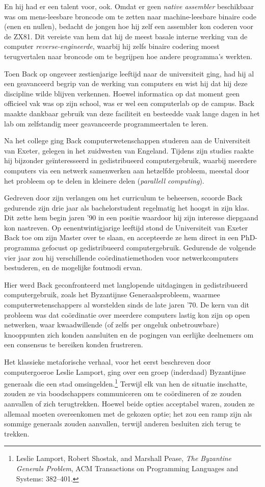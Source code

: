 \documentclass[
  a5paper,
  smalldemyvopaper,11pt,twoside,onecolumn,openright,extrafontsizes,
hidelinks]{memoir}
\begin{document}
En hij had er een talent voor, ook. Omdat er geen \emph{native
assembler} beschikbaar was om mens-leesbare broncode om te zetten naar
machine-leesbare binaire code (enen en nullen), bedacht de jongen hoe
hij zelf een assembler kon coderen voor de ZX81. Dit vereiste van hem
dat hij de meest basale interne werking van de computer
\emph{reverse-engineerde}, waarbij hij zelfs binaire codering moest
terugvertalen naar broncode om te begrijpen hoe andere programma's
werkten.

Toen Back op ongeveer zestienjarige leeftijd naar de universiteit ging,
had hij al een geavanceerd begrip van de werking van computers en wist
hij dat hij deze discipline wilde blijven verkennen. Hoewel informatica
op dat moment geen officieel vak was op zijn school, was er wel een
computerlab op de campus. Back maakte dankbaar gebruik van deze
faciliteit en besteedde vaak lange dagen in het lab om zelfstandig meer
geavanceerde programmeertalen te leren.

Na het college ging Back computerwetenschappen studeren aan de
Universiteit van Exeter, gelegen in het zuidwesten van Engeland. Tijdens
zijn studies raakte hij bijzonder geïnteresseerd in gedistribueerd
computergebruik, waarbij meerdere computers via een netwerk samenwerken
aan hetzelfde probleem, meestal door het probleem op te delen in
kleinere delen (\emph{parallell computing}).

Gedreven door zijn verlangen om het curriculum te beheersen, scoorde
Back gedurende zijn drie jaar als bachelorstudent regelmatig het hoogst
in zijn klas. Dit zette hem begin jaren '90 in een positie waardoor hij
zijn interesse diepgaand kon nastreven. Op eenentwintigjarige leeftijd
stond de Universiteit van Exeter Back toe om zijn Master over te slaan,
en accepteerde ze hem direct in een PhD-programma gefocust op
gedistribueerd computergebruik. Gedurende de volgende vier jaar zou hij
verschillende coördinatiemethoden voor netwerkcomputers bestuderen, en
de mogelijke foutmodi ervan.

Hier werd Back geconfronteerd met langlopende uitdagingen in
gedistribueerd computergebruik, zoals het Byzantijnse Generaalsprobleem,
waarmee computerwetenschappers al worstelden sinds de late jaren '70. De
kern van dit probleem was dat coördinatie over meerdere computers lastig
kon zijn op open netwerken, waar kwaadwillende (of zelfs per ongeluk
onbetrouwbare) knooppunten zich konden aansluiten en de pogingen van
eerlijke deelnemers om een consensus te bereiken konden frustreren.

Het klassieke metaforische verhaal, voor het eerst beschreven door
computergoeroe Leslie Lamport, ging over een groep (inderdaad)
Byzantijnse generaals die een stad omsingelden.\footnote{Leslie Lamport,
  Robert Shostak, and Marshall Pease, \emph{The Byzantine Generals
  Problem}, ACM Transactions on Programming Languages and Systems:
  382--401.} Terwijl elk van hen de situatie inschatte, zouden ze via
boodschappers communiceren om te coördineren of ze zouden aanvallen of
zich terugtrekken. Hoewel beide opties acceptabel waren, zouden ze
allemaal moeten overeenkomen met de gekozen optie; het zou een ramp zijn
als sommige generaals zouden aanvallen, terwijl anderen besluiten zich
terug te trekken.
\end{document}

